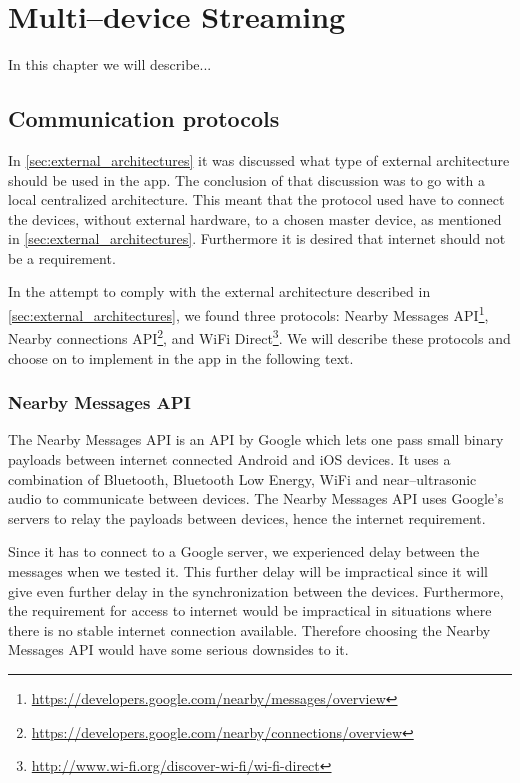 \chapter{Multi--device Streaming}
In this chapter we will describe...

\section{Communication protocols}
In \cref{sec:external_architectures} it was discussed what type of external architecture should be used in the app.
The conclusion of that discussion was to go with a local centralized architecture.
This meant that the protocol used have to connect the devices, without external hardware, to a chosen master device, as mentioned in \cref{sec:external_architectures}.
Furthermore it is desired that internet should not be a requirement.

In the attempt to comply with the external architecture described in \cref{sec:external_architectures}, we found three protocols: Nearby Messages API\footnote{\url{https://developers.google.com/nearby/messages/overview}}, Nearby connections API\footnote{\url{https://developers.google.com/nearby/connections/overview}}, and WiFi Direct\footnote{\url{http://www.wi-fi.org/discover-wi-fi/wi-fi-direct}}.
We will describe these protocols and choose on to implement in the app in the following text.

\subsection{Nearby Messages API}
The Nearby Messages API is an API by Google which lets one pass small binary payloads between internet connected Android and iOS devices. 
It uses a combination of Bluetooth, Bluetooth Low Energy, WiFi and near--ultrasonic audio to communicate between devices.
The Nearby Messages API uses Google's servers to relay the payloads between devices, hence the internet requirement.\cite{nearby_messages}

Since it has to connect to a Google server, we experienced delay between the messages when we tested it.
This further delay will be impractical since it will give even further delay in the synchronization between the devices.
Furthermore, the requirement for access to internet would be impractical in situations where there is no stable internet connection available.
Therefore choosing the Nearby Messages API would have some serious downsides to it. 

